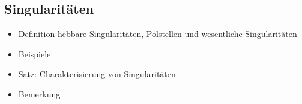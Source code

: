 \documentclass[8pt,a4paper,fleqn]{article}
\begin{document}
\begin{multicols}{2}
  \subsection{Singularitäten} %
  \label{sub:singularitäten}
  \begin{itemize}
    \item Definition hebbare Singularitäten, Polstellen und wesentliche Singularitäten
    \item Beispiele
    \item Satz: Charakterisierung von Singularitäten
    \item Bemerkung
  \end{itemize}
  \end{multicols}
\end{document}
